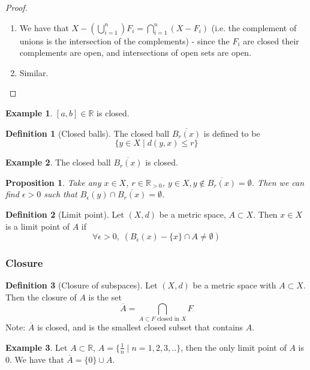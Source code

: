 \documentclass{article}
\theoremstyle{definition}
\newtheorem{defn}{Definition}[section]
\newtheorem{exmp}{Example}[section]
\theoremstyle{plain}%
\newtheorem{prop}[thm]{Proposition}
\theoremstyle{remark}
\newcommand{\union}{\cup}
\newcommand{\Union}{\bigcup}
\newcommand{\R}{\mathbb{R}}
\begin{document}
\begin{proof}
\hspace{0.1em}
\begin{enumerate}
    \item We have that $X - (\Union_{i=1}^n) F_i = \bigcap_{i=1}^n (X - F_i)$ (i.e. the complement of unions is the intersection of the complements) - since the $F_i$ are closed their complements are open, and intersections of open sets are open.
    \item Similar.
\end{enumerate}
\end{proof}

\begin{exmp}
$[a,b] \in \R$ is closed.
\end{exmp}

\begin{defn}[Closed balls]
The closed ball $\overline{B_r(x)}$ is defined to be \[\{y \in X \; | \; d(y,x) \le r\}\]
\end{defn}

\begin{exmp}
The closed ball $\overline{B_r(x)}$ is closed.
\end{exmp}

\begin{prop}
Take any $x \in X$, $r \in \R_{>0}$, $y \in X, y \not\in \overline{B_r(x)} = \emptyset$. Then we can find $\epsilon > 0$ such that $B_{\epsilon}(y) \cap \overline{B_r(x)} = \emptyset$.
\end{prop}

\begin{defn}[Limit point]
Let $(X, d)$ be a metric space, $A \subset X$. Then $x \in X$ is a limit point of $A$ if \[\forall \epsilon > 0, \; (B_{\epsilon}(x) - \{x\} \cap A \ne \emptyset)\]
\end{defn}

\subsubsection{Closure}

\begin{defn}[Closure of subspaces]
Let $(X,d)$ be a metric space with $A \subset X$. Then the closure of $A$ is the set \[\overline{A} = \bigcap_{A \subset F \text{ closed in } X} F\]
Note: $\overline{A}$ is closed, and is the smallest closed subset that contains $A$.
\end{defn}

\begin{exmp}
Let $A \subset \R$, $A = \{\frac{1}{n} \; | \; n=1,2,3,..\}$, then the only limit point of $A$ is 0. We have that $\overline{A} = \{0\} \union A$.
\end{exmp}
\end{document}
